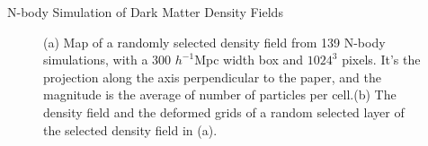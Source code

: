 \begin{section}{N-body Simulation of Dark Matter Density Fields}
\begin{figure}
 \label{fig:simandrec}
   \caption{(a) Map of a randomly selected density field from 139 N-body simulations, with a 300 $h^{-1}$Mpc width box and $1024^3$ pixels. It's the projection along the axis perpendicular to the paper, and the magnitude is the average of number of particles per cell.(b) The density field and the deformed grids of a random selected layer of the selected density field in (a).}
\end{figure}

\end{section}

